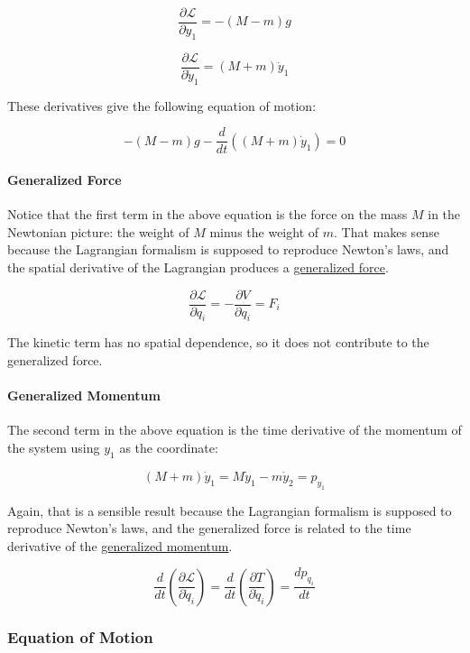 \documentclass[11pt]{article}
\begin{document}
\[\dfrac{\partial \mathcal{L}}{\partial y_1} = -(M-m)g\]

\[\dfrac{\partial \mathcal{L}}{\partial \dot{y}_1} = (M+m)\dot{y}_1\]

These derivatives give the following equation of motion:

\[-(M-m) g - \dfrac{d}{dt}\left((M+m)\dot{y}_1\right) = 0\]

\paragraph{Generalized Force}\label{generalized-force}

Notice that the first term in the above equation is the force on the
mass \(M\) in the Newtonian picture: the weight of \(M\) minus the
weight of \(m\). That makes sense because the Lagrangian formalism is
supposed to reproduce Newton's laws, and the spatial derivative of the
Lagrangian produces a
\href{https://en.wikipedia.org/wiki/Generalized_force}{generalized
force}.

\[\dfrac{\partial \mathcal{L}}{\partial q_i} = -\dfrac{\partial V}{\partial q_i} = F_i\]

The kinetic term has no spatial dependence, so it does not contribute to
the generalized force.

\paragraph{Generalized Momentum}\label{generalized-momentum}

The second term in the above equation is the time derivative of the
momentum of the system using \(y_1\) as the coordinate:

\[(M+m)\dot{y}_1 = M\dot{y}_1 - m\dot{y}_2 = p_{y_1}\]

Again, that is a sensible result because the Lagrangian formalism is
supposed to reproduce Newton's laws, and the generalized force is
related to the time derivative of the
\href{https://phys.libretexts.org/Bookshelves/Classical_Mechanics/Variational_Principles_in_Classical_Mechanics_(Cline)/07\%3A_Symmetries_Invariance_and_the_Hamiltonian/7.02\%3A_Generalized_Momentum}{generalized
momentum}.

\[\dfrac{d}{dt}\left(\dfrac{\partial \mathcal{L}}{\partial \dot{q}_i}\right) = \dfrac{d}{dt}\left(\dfrac{\partial T}{\partial \dot{q}_i}\right) = \dfrac{dp_{q_i}}{dt}\]

\subsubsection{Equation of Motion}\label{equation-of-motion}
\end{document}
